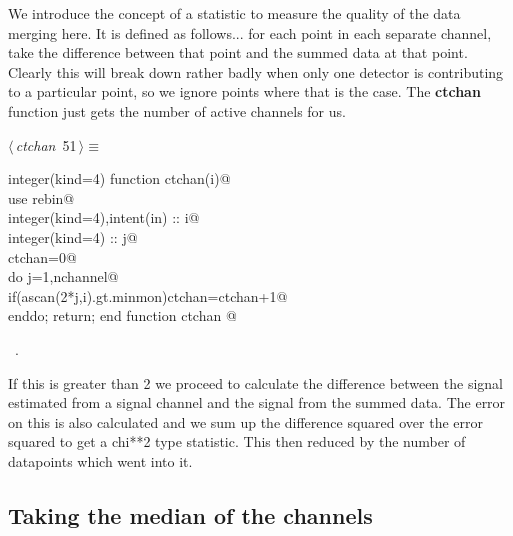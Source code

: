 \documentclass[10pt,a4paper,notitlepage]{article}
\newcommand{\code}[1]{\textbf{\textsf{#1}}} %
\begin{document}
We introduce the concept of a statistic to measure the quality of the data
merging here. 
It is defined as follows... for each point in each separate channel,
take the difference between that point and the summed data at that
point.
Clearly this will break down rather badly when only one detector is
contributing to a particular point, so we ignore points where that is 
the case. The \code{ctchan} function just gets the number of
active channels for us. 
\begin{flushleft} \small
\begin{minipage}{\linewidth}\label{scrap54}\raggedright\small
{} $\langle\,${\it ctchan}\nobreak\ {\footnotesize {51}}$\,\rangle\equiv$
\vspace{-1ex}
\begin{list}{}{} \item
\mbox{}\verb@      integer(kind=4) function ctchan(i)@\\
\mbox{}\verb@      use rebin@\\
\mbox{}\verb@      integer(kind=4),intent(in) :: i@\\
\mbox{}\verb@      integer(kind=4) :: j@\\
\mbox{}\verb@      ctchan=0@\\
\mbox{}\verb@      do j=1,nchannel@\\
\mbox{}\verb@        if(ascan(2*j,i).gt.minmon)ctchan=ctchan+1@\\
\mbox{}\verb@      enddo; return; end function ctchan                                  @{\NWsep}
\end{list}
\vspace{-1.5ex}
\footnotesize
\begin{list}{}{\setlength{\itemsep}{-\parsep}\setlength{\itemindent}{-\leftmargin}}
\item \NWtxtMacroRefIn\ .

\item{}
\end{list}
\end{minipage}\vspace{4ex}
\end{flushleft}
If this is greater than 2 we proceed to calculate the difference between
the signal estimated from a signal channel and the signal from the summed
data. 
The error on this is also calculated and we sum up the difference squared
over the error squared to get a chi**2 type statistic. 
This then reduced by the number of datapoints which went into it.

\subsection{Taking the median of the channels}
\end{document}
